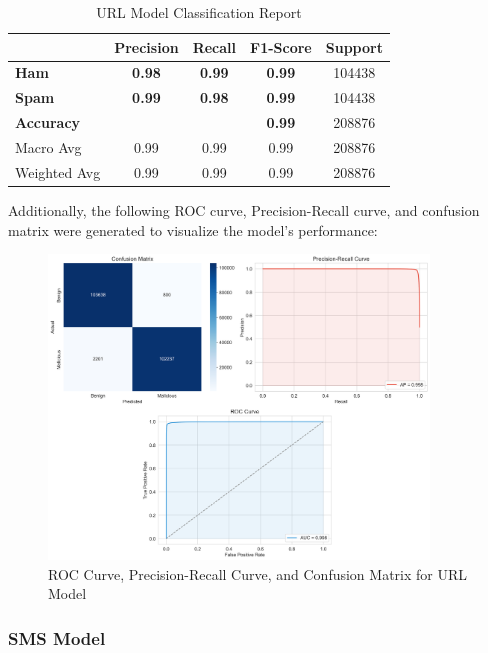 \documentclass{article}
\begin{document}
\begin{table}[htbp]
    \centering
    \caption{URL Model Classification Report}
    \begin{tabular}{l c c c c}
    \toprule
     & \textbf{Precision} & \textbf{Recall} & \textbf{F1-Score} & Support \\
    \midrule
    \textbf{Ham} & \textbf{0.98} & \textbf{0.99} & \textbf{0.99} & 104438 \\
    \textbf{Spam} & \textbf{0.99} & \textbf{0.98} & \textbf{0.99} & 104438 \\
    \midrule
    \textbf{Accuracy} & & & \textbf{0.99} & 208876 \\
    Macro Avg & 0.99 & 0.99 & 0.99 & 208876 \\
    Weighted Avg & 0.99 & 0.99 & 0.99 & 208876 \\
    \bottomrule
    \end{tabular}
    \label{tab:classification_report}
\end{table}

\noindent
Additionally, the following ROC curve, Precision-Recall curve, and confusion matrix were generated to visualize the model's performance:

\begin{figure}[htbp]
    \centering
    \includegraphics[width=0.9\textwidth]{../analysis/url/combined_metrics.png}
    \caption{ROC Curve, Precision-Recall Curve, and Confusion Matrix for URL Model}
    \label{fig:combined_metrics_1}
\end{figure}

\subsubsection{SMS Model}
\end{document}
